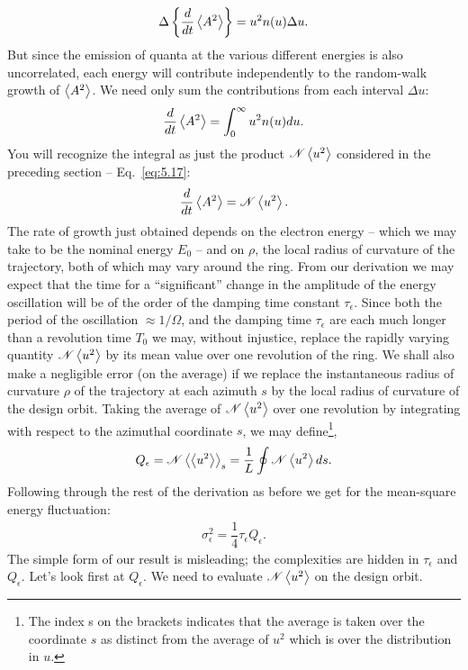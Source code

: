 \begin{align}
	\Delta \left\lbrace \dfrac{d}{dt}\left< A^2 \right> \right\rbrace = u^2 n(u) \Delta u.
\end{align}
But since the emission of quanta at the various different energies is also uncorrelated, each energy will contribute independently to the random-walk growth of $\left< A^2 \right>$. We need only sum the contributions from each interval $\Delta u$:
\begin{align}
	\dfrac{d}{dt}\left< A^2 \right> = \int_0^\infty u^2 n(u) du.
\end{align}
You will recognize the integral as just the product $\mathscr{N}\left< u^2 \right>$ considered in the preceding section -- Eq.~\eqref{eq:5.17}:
\begin{align}
	\dfrac{d}{dt} \left< A^2 \right> = \mathscr{N} \left< u^2 \right>.
\end{align}
The rate of growth just obtained depends on the electron energy -- which we may take to be the nominal energy $E_0$ -- and on $\rho$, the local radius of curvature of the trajectory, both of which may vary around the ring. From our derivation we may expect that the time for a ``significant'' change in the amplitude of the energy oscillation will be of the order of the damping time constant $\tau_\epsilon$. Since both the period of the oscillation $\approx 1/\Omega$,
 and the damping time $\tau_\epsilon$ are each much longer than a revolution time $T_0$ we may, without injustice, replace the rapidly varying quantity $\mathscr{N}\left< u^2 \right>$ by its mean value over one revolution of the ring. We shall also make a negligible error (on the average) if we replace the instantaneous radius of curvature $\rho$ of the trajectory at each azimuth $s$ by the local radius of curvature of the design orbit. Taking the average of $\mathscr{N}\left< u^2 \right>$
 over one revolution by integrating with respect to the azimuthal coordinate $s$, we may define\footnote{The index s on the brackets indicates that the average is taken over the coordinate $s$ as distinct from the average of $u^2$ which is over the distribution in $u$.},
\begin{align}
	Q_\epsilon = \mathscr{N}\left< \left< u^2 \right> \right>_s = \dfrac{1}{L} \oint \mathscr{N} \left< u^2 \right> ds.
\end{align}
Following through the rest of the derivation as before we get for the mean-square energy fluctuation:
\begin{align} \label{eq:5.37}
	\sigma_\epsilon^2 = \dfrac{1}{4} \tau_\epsilon Q_\epsilon.
\end{align}
The simple form of our result is misleading; the complexities are hidden in $\tau_\epsilon$ and $Q_\epsilon$. Let's look first at $Q_\epsilon$. We need to evaluate $\mathscr{N} \left< u^2 \right>$ on the design orbit.\\
